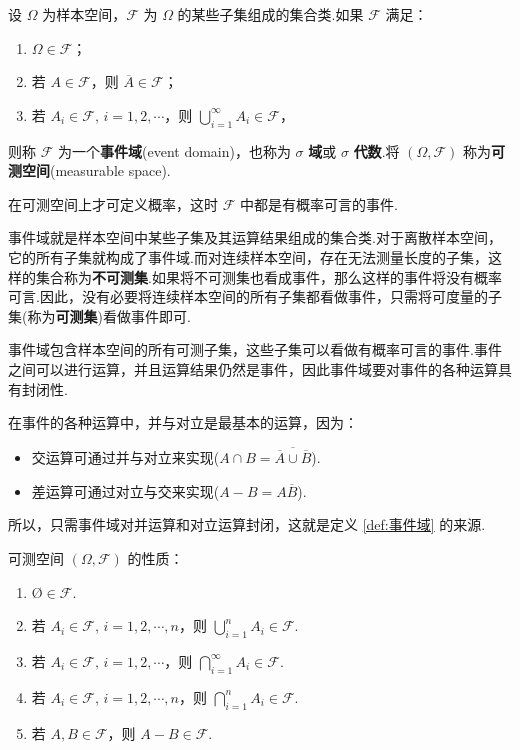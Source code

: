 \begin{definition}
    \indent 设 $\varOmega$ 为样本空间，$\mathcal{F}$ 为 $\varOmega$ 的某些子集组成的集合类.如果 $\mathcal{F}$ 满足：
    \begin{enumerate}
        \item $\varOmega \in \mathcal{F}$；
        \item 若 $A \in \mathcal{F}$，则 $\overline{A} \in \mathcal{F}$；
        \item 若 $A_i \in \mathcal{F}, \, i=1,2,\cdots$，则 $\displaystyle\bigcup_{i=1}^\infty A_i \in \mathcal{F}$，
    \end{enumerate}
    则称 $\mathcal{F}$ 为一个\textbf{事件域}(event domain)，也称为 $\sigma$ \textbf{域}或 $\sigma$ \textbf{代数}.将 $(\varOmega, \mathcal{F})$ 称为\textbf{可测空间}(measurable space).
\end{definition}

在可测空间上才可定义概率，这时 $\mathcal{F}$ 中都是有概率可言的事件.

\begin{note}
    \indent 事件域就是样本空间中某些子集及其运算结果组成的集合类.对于离散样本空间，它的所有子集就构成了事件域.而对连续样本空间，存在无法测量长度的子集，这样的集合称为\textbf{不可测集}.如果将不可测集也看成事件，那么这样的事件将没有概率可言.因此，没有必要将连续样本空间的所有子集都看做事件，只需将可度量的子集(称为\textbf{可测集})看做事件即可.

    \indent 事件域包含样本空间的所有可测子集，这些子集可以看做有概率可言的事件.事件之间可以进行运算，并且运算结果仍然是事件，因此事件域要对事件的各种运算具有封闭性.

    \indent 在事件的各种运算中，并与对立是最基本的运算，因为：
    \begin{itemize}
        \item 交运算可通过并与对立来实现($A \cap B = \overline{\overline{A} \cup \overline{B}}$).
        \item 差运算可通过对立与交来实现($A-B = A \overline{B}$).
    \end{itemize}
    所以，只需事件域对并运算和对立运算封闭，这就是定义 \ref{def:事件域} 的来源.
\end{note}

\begin{property}
    \indent 可测空间 $(\varOmega, \mathcal{F})$ 的性质：
    \begin{enumerate}
        \item $\text{\O} \in \mathcal{F}$.
        \item 若 $A_i \in \mathcal{F}, \, i=1,2,\cdots,n$，则 $\displaystyle\bigcup_{i=1}^n A_i \in \mathcal{F}$.
        \item 若 $A_i \in \mathcal{F}, \, i=1,2,\cdots$，则 $\displaystyle\bigcap_{i=1}^{\infty} A_i \in \mathcal{F}$.
        \item 若 $A_i \in \mathcal{F}, \, i=1,2,\cdots,n$，则 $\displaystyle\bigcap_{i=1}^n A_i \in \mathcal{F}$.
        \item 若 $A,B \in \mathcal{F}$，则 $A-B \in \mathcal{F}$.
    \end{enumerate}
\end{property}

